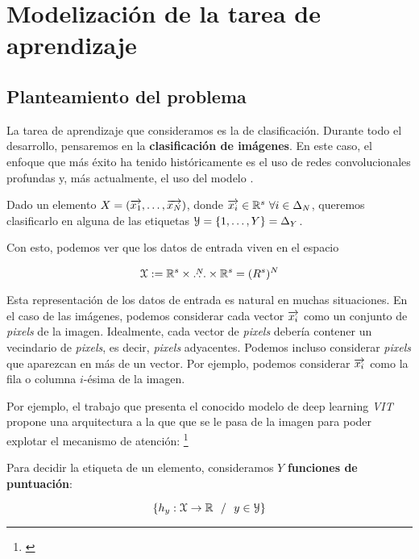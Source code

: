 \chapter{Modelización de la tarea de aprendizaje} \label{ch:tarea_aprendizaje}

\section{Planteamiento del problema}

La tarea de aprendizaje que consideramos es la de clasificación. Durante todo el desarrollo, pensaremos en la \textbf{clasificación de imágenes}. En este caso, el enfoque que más éxito ha tenido históricamente es el uso de redes convolucionales profundas y, más actualmente, el uso del modelo .

Dado un elemento $X = (\overrightarrow{x_1}, \ldots, \overrightarrow{x_N})$, donde $\nv{x_i} \in \R^s \ \forall i \in \deltaset{N}$, queremos clasificarlo en alguna de las etiquetas $\mathcal{Y} = \{1, \ldots, Y \} = \Delta_{Y}$.

Con esto, podemos ver que los datos de entrada viven en el espacio

$$\mathcal{X} := \mathbb{R}^s \times \overset{N}{\ldots} \times \mathbb{R}^s = (R^s)^N$$

Esta representación de los datos de entrada es natural en muchas situaciones. En el caso de las imágenes, podemos considerar cada vector $\overrightarrow{x_i}$ como un conjunto de \textit{pixels} de la imagen. Idealmente, cada vector de \textit{pixels} debería contener un vecindario de \textit{pixels}, es decir, \textit{pixels} adyacentes. Podemos incluso considerar \textit{pixels} que aparezcan en más de un vector. Por ejemplo, podemos considerar $\overrightarrow{x_i}$ como la fila o columna $i$-ésima de la imagen.

Por ejemplo, el trabajo que presenta el conocido modelo  de deep learning \textit{VIT} propone una arquitectura  a la que que se le pasa  de la imagen para poder explotar el mecanismo de atención:  \footnote{\cite{matematicas:vit}}

Para decidir la etiqueta de un elemento, consideramos $Y$ \textbf{funciones de puntuación}:

$$\{h_y: \mathcal{X} \to \mathbb{R} \ \  / \ \  y \in \mathcal{Y} \}$$

